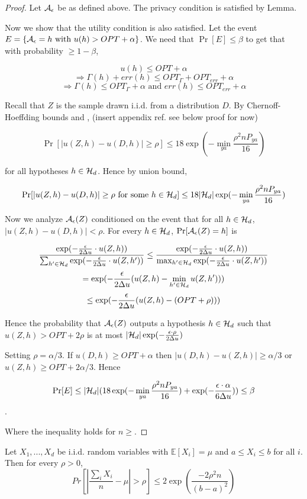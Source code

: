 \begin{proof}
	Let $\mathcal{A}_{\epsilon}$ be as defined above. The privacy condition is
	satisfied by Lemma.
	
	Now we show that the utility condition is also satisfied. Let the
	event $E = \{\mathcal{A}_{\epsilon} = h \text{ with } u(h) > OPT + \alpha\}$.
	We need that $\Pr[E] \leq \beta$ to get that with probability $\geq 1-\beta$,
	
	$$u(h) \leq OPT + \alpha$$
	$$\Rightarrow \Gamma(h) + err(h) \leq OPT_\Gamma + OPT_{err} +\alpha$$
	$$\Rightarrow \Gamma(h) \leq OPT_\Gamma +\alpha \text{ and } err(h) \leq OPT_{err} +\alpha$$
	
	Recall that $Z$ is the sample drawn i.i.d. from a distribution $D$.
	By Chernoff-Hoeffding bounds and \cite{woodworthFollowUp}, (insert appendix ref. see below proof
	for now)
	
	$$\Pr[|u(Z,h) - u(D,h)| \geq \rho] \leq 18\exp(-\min_{ya}{\frac{\rho^2 n P_{ya}}{16}})$$
	
	for all hypotheses $h \in \mathcal{H}_d$. Hence by union bound,
	
	$$\Pr[|u(Z,h) - u(D,h)| \geq \rho \text{ for some } h \in \mathcal{H}_d] \leq 18|\mathcal{H}_d|\exp(-\min_{ya}{\frac{\rho^2 n P_{ya}}{16}})$$
	
	Now we analyze $\mathcal{A}_\epsilon(Z)$ conditioned on the event that for all
	$h\in \mathcal{H}_d$, $|u(Z,h) - u(D,h)| < \rho$. For every $h \in \mathcal{H}_d$, $\Pr[\mathcal{A}_\epsilon(Z) = h]$ is
	
	$$\frac{\exp(-\frac{\epsilon}{2\Delta u} \cdot
		u(Z,h))}{\sum_{h'\in\mathcal{H}_d}\exp(-\frac{\epsilon}{2\Delta u} \cdot u(Z,h'))}
	\leq \frac{\exp(-\frac{\epsilon}{2\Delta u} \cdot
		u(Z,h))}{\max_{h'\in\mathcal{H}_d}\exp(-\frac{\epsilon}{2\Delta u} \cdot u(Z,h'))} $$
	$$= \exp(-\frac{\epsilon}{2\Delta u}(u(Z,h) - \min_{h'\in\mathcal{H}_d}u(Z,h')))$$
	$$\leq \exp(-\frac{\epsilon}{2\Delta u}(u(Z,h) - (OPT + \rho)))$$
	
	Hence the probability that $\mathcal{A}_\epsilon(Z)$ outputs a hypothesis $h \in
	\mathcal{H}_d$ such that $u(Z,h) > OPT + 2\rho$ is at most
	$|\mathcal{H}_d|\exp(-\frac{\epsilon\cdot\rho}{2\Delta u})$
	
	Setting $\rho = \alpha/3$. If $u(D,h) \geq OPT + \alpha$ then
	$|u(D,h) - u(Z,h)| \geq \alpha/3$ or $u(Z,h) \geq OPT + 2\alpha/3$.
	Hence
	
	$$\Pr[E] \leq |\mathcal{H}_d|(18\exp(-\min_{ya}{\frac{\rho^2 n P_{ya}}{16}}) + \exp(-\frac{\epsilon\cdot\alpha}{6\Delta u})) \leq \beta$$.
	
	Where the inequality holds for $n \geq $.
\end{proof}
\begin{theorem}
	Let $X_1,...,X_d$ be i.i.d. random variables with $\mathbb{E}[X_i] = \mu$ and $a \leq X_i \leq b$ for all $i$. Then for every $\rho > 0$,
	$$Pr[|\frac{\sum_i X_i}{n} - \mu| > \rho] \leq 2\exp(\frac{-2\rho^2n}{(b-a)^2})$$
\end{theorem}

